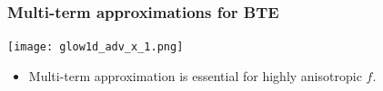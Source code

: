 \documentclass[mathserif, aspectratio=169]{beamer}
\newcommand{\vect}[1]{\boldsymbol{#1}}
\newcommand{\of}[1]{\mleft( #1 \mright)}
\newcommand{\vtheta}{{v_{\theta}}}
\begin{document}
\begin{frame}
	
\end{frame}

\begin{frame}
	\frametitle{Multi-term approximations for BTE}
	\begin{center}
		\texttt{[image: glow1d\_adv\_x\_1.png]} 
	\end{center}
	\begin{itemize}
		\item Multi-term approximation is essential for highly anisotropic $f$. 
	\end{itemize}
\end{frame}
\end{document}
